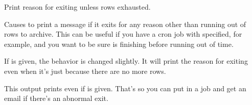 \documentclass[letterpaper,10pt,english]{sphinxmanual}
\begin{document}
\begin{fulllineitems}
\label{\detokenize{mariadb-archiver:cmdoption-mariadb-archiver-why-quit}}
\sphinxAtStartPar
Print reason for exiting unless rows exhausted.

\sphinxAtStartPar
Causes  to print a message if it exits for any reason other than
running out of rows to archive.  This can be useful if you have a cron job with
{\hyperref[\detokenize{mariadb-archiver:cmdoption-mariadb-archiver-run-time}]{}} specified, for example, and you want to be sure  is
finishing before running out of time.

\sphinxAtStartPar
If {\hyperref[\detokenize{mariadb-archiver:cmdoption-mariadb-archiver-statistics}]{}} is given, the behavior is changed slightly.  It will print
the reason for exiting even when it’s just because there are no more rows.

\sphinxAtStartPar
This output prints even if {\hyperref[\detokenize{mariadb-archiver:cmdoption-mariadb-archiver-quiet}]{}} is given.  That’s so you can put
 in a  job and get an email if there’s an abnormal exit.

\end{fulllineitems}
\end{document}
